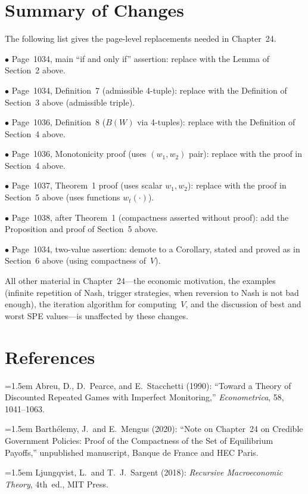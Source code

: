 \section{Summary of Changes}

The following list gives the page-level replacements needed in
Chapter~24.

\medskip
\item{$\bullet$}
Page~1034, main ``if and only if'' assertion: replace with the Lemma
of Section~2 above.

\item{$\bullet$}
Page~1034, Definition~7 (admissible 4-tuple): replace with the
Definition of Section~3 above (admissible triple).

\item{$\bullet$}
Page~1036, Definition~8 ($B(W)$ via 4-tuples): replace with the
Definition of Section~4 above.

\item{$\bullet$}
Page~1036, Monotonicity proof (uses $(w_1,w_2)$ pair): replace with
the proof in Section~4 above.

\item{$\bullet$}
Page~1037, Theorem~1 proof (uses scalar $w_1,w_2$): replace with the
proof in Section~5 above (uses functions $w_t(\cdot)$).

\item{$\bullet$}
Page~1038, after Theorem~1 (compactness asserted without proof): add
the Proposition and proof of Section~5 above.

\item{$\bullet$}
Page~1034, two-value assertion: demote to a Corollary, stated and
proved as in Section~6 above (using compactness of~$V$).

\medskip\noindent
All other material in Chapter~24---the economic motivation, the
examples (infinite repetition of Nash, trigger strategies, when
reversion to Nash is not bad enough), the iteration algorithm for
computing~$V$, and the discussion of best and worst SPE values---is
unaffected by these changes.

\section*{References}

\medskip\noindent\hangindent=1.5em
Abreu, D., D.~Pearce, and E.~Stacchetti (1990): ``Toward a Theory of
Discounted Repeated Games with Imperfect Monitoring,''
{\sl Econometrica\/}, 58, 1041--1063.

\medskip\noindent\hangindent=1.5em
Barth\'elemy, J.\ and E.~Mengus (2020): ``Note on Chapter~24 on
Credible Government Policies: Proof of the Compactness of the Set of
Equilibrium Payoffs,'' unpublished manuscript, Banque de France and
HEC Paris.

\medskip\noindent\hangindent=1.5em
Ljungqvist, L.\ and T.~J.~Sargent (2018): {\sl Recursive
Macroeconomic Theory}, 4th~ed., MIT Press.

\bye
